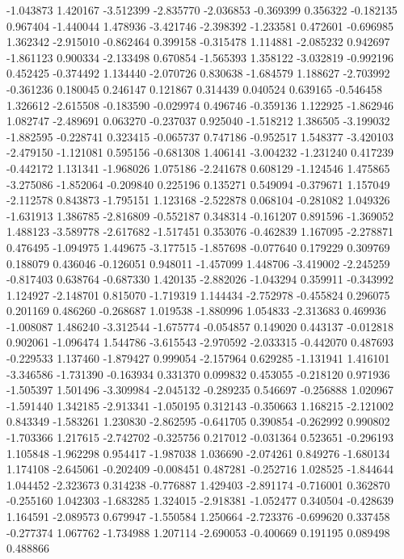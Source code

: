 -1.043873
1.420167
-3.512399
-2.835770
-2.036853
-0.369399
0.356322
-0.182135
0.967404
-1.440044
1.478936
-3.421746
-2.398392
-1.233581
0.472601
-0.696985
1.362342
-2.915010
-0.862464
0.399158
-0.315478
1.114881
-2.085232
0.942697
-1.861123
0.900334
-2.133498
0.670854
-1.565393
1.358122
-3.032819
-0.992196
0.452425
-0.374492
1.134440
-2.070726
0.830638
-1.684579
1.188627
-2.703992
-0.361236
0.180045
0.246147
0.121867
0.314439
0.040524
0.639165
-0.546458
1.326612
-2.615508
-0.183590
-0.029974
0.496746
-0.359136
1.122925
-1.862946
1.082747
-2.489691
0.063270
-0.237037
0.925040
-1.518212
1.386505
-3.199032
-1.882595
-0.228741
0.323415
-0.065737
0.747186
-0.952517
1.548377
-3.420103
-2.479150
-1.121081
0.595156
-0.681308
1.406141
-3.004232
-1.231240
0.417239
-0.442172
1.131341
-1.968026
1.075186
-2.241678
0.608129
-1.124546
1.475865
-3.275086
-1.852064
-0.209840
0.225196
0.135271
0.549094
-0.379671
1.157049
-2.112578
0.843873
-1.795151
1.123168
-2.522878
0.068104
-0.281082
1.049326
-1.631913
1.386785
-2.816809
-0.552187
0.348314
-0.161207
0.891596
-1.369052
1.488123
-3.589778
-2.617682
-1.517451
0.353076
-0.462839
1.167095
-2.278871
0.476495
-1.094975
1.449675
-3.177515
-1.857698
-0.077640
0.179229
0.309769
0.188079
0.436046
-0.126051
0.948011
-1.457099
1.448706
-3.419002
-2.245259
-0.817403
0.638764
-0.687330
1.420135
-2.882026
-1.043294
0.359911
-0.343992
1.124927
-2.148701
0.815070
-1.719319
1.144434
-2.752978
-0.455824
0.296075
0.201169
0.486260
-0.268687
1.019538
-1.880996
1.054833
-2.313683
0.469936
-1.008087
1.486240
-3.312544
-1.675774
-0.054857
0.149020
0.443137
-0.012818
0.902061
-1.096474
1.544786
-3.615543
-2.970592
-2.033315
-0.442070
0.487693
-0.229533
1.137460
-1.879427
0.999054
-2.157964
0.629285
-1.131941
1.416101
-3.346586
-1.731390
-0.163934
0.331370
0.099832
0.453055
-0.218120
0.971936
-1.505397
1.501496
-3.309984
-2.045132
-0.289235
0.546697
-0.256888
1.020967
-1.591440
1.342185
-2.913341
-1.050195
0.312143
-0.350663
1.168215
-2.121002
0.843349
-1.583261
1.230830
-2.862595
-0.641705
0.390854
-0.262992
0.990802
-1.703366
1.217615
-2.742702
-0.325756
0.217012
-0.031364
0.523651
-0.296193
1.105848
-1.962298
0.954417
-1.987038
1.036690
-2.074261
0.849276
-1.680134
1.174108
-2.645061
-0.202409
-0.008451
0.487281
-0.252716
1.028525
-1.844644
1.044452
-2.323673
0.314238
-0.776887
1.429403
-2.891174
-0.716001
0.362870
-0.255160
1.042303
-1.683285
1.324015
-2.918381
-1.052477
0.340504
-0.428639
1.164591
-2.089573
0.679947
-1.550584
1.250664
-2.723376
-0.699620
0.337458
-0.277374
1.067762
-1.734988
1.207114
-2.690053
-0.400669
0.191195
0.089498
0.488866

